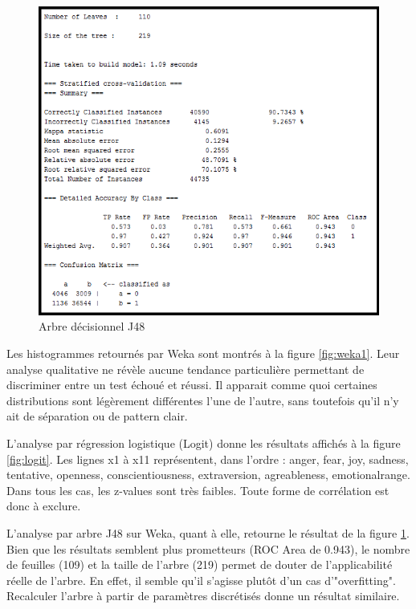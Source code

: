 \documentclass[10pt, conference]{IEEEtran}
\begin{document}
\begin{figure}[t]
  \includegraphics[width=\linewidth]{wekaresult.png}
  \caption{Arbre décisionnel J48}
  \label{fig:weka2}
\end{figure}

Les histogrammes retournés par Weka sont montrés à la figure \ref{fig:weka1}. Leur analyse qualitative ne révèle aucune tendance particulière permettant de discriminer entre un test échoué et réussi. Il apparait comme quoi certaines distributions sont légèrement différentes l'une de l'autre, sans toutefois qu'il n'y ait de séparation ou de pattern clair.

L’analyse par régression logistique (Logit) donne les résultats affichés à la figure \ref{fig:logit}. Les lignes x1 à x11 représentent, dans l’ordre : anger, fear, joy, sadness, tentative, openness, conscientiousness, extraversion, agreableness, emotionalrange. Dans tous les cas, les z-values sont très faibles. Toute forme de corrélation est donc à exclure. 

L’analyse par arbre J48 sur Weka, quant à elle, retourne le résultat de la figure \ref{fig:weka2}. Bien que les résultats semblent plus prometteurs (ROC Area de 0.943), le nombre de feuilles (109) et la taille de l’arbre (219) permet de douter de l’applicabilité réelle de l’arbre. En effet, il semble qu'il s'agisse plutôt d'un cas d'"overfitting". Recalculer l'arbre à partir de paramètres discrétisés donne un résultat similaire.
\end{document}
